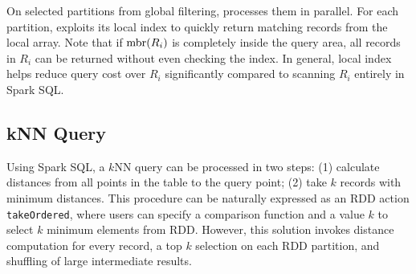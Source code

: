  On selected partitions from global
filtering, \name processes them in parallel. For each partition, \name
exploits its local index to quickly return matching records from the
local array. Note that if $\operatorname{mbr}(R_i)$ is completely inside the query
area, all records in $R_i$ can be returned without even checking the
index. In general, local index helps reduce query cost over $R_i$
significantly compared to scanning $R_i$ entirely in Spark SQL.

\subsection{kNN Query}
\label{sub:knn}
Using Spark SQL, a $k$NN query can be processed in two steps: (1)
calculate distances from all points in the table to the query point;
(2) take $k$ records with minimum distances. This procedure can be
naturally expressed as an RDD action \texttt{takeOrdered}, where users
can specify a comparison function and a value $k$ to select $k$
minimum elements from RDD. However, this solution invokes distance
computation for every record, a top $k$ selection on each RDD
partition, and shuffling of large intermediate results.

